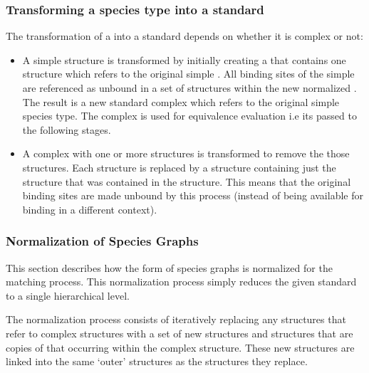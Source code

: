 \documentclass{cekarticle}
\begin{document}
\subsubsection{Transforming a species type into a standard }
\label{sec:trans-type}

The transformation of a  into a standard
 depends on whether it is complex or not:

\begin{itemize}

\item A simple  structure is transformed by
initially creating a  that contains one
 structure which refers to the original
simple . All binding sites of the simple
 are referenced as unbound in a set of
 structures within the new normalized
.  The result is a new standard complex
 which refers to the original simple species
type.  The complex  is used for equivalence
evaluation i.e its passed to the following stages.

\item A complex  with one or more
 structures is transformed to remove the those
 structures. Each  structure
is replaced by a  structure containing just
the  structure that was contained in
the  structure.  This means that the original
binding sites are made unbound by this process (instead of being
available for binding in a different context).

\end{itemize}

\subsubsection{Normalization of Species Graphs}
\label{sec:norm-graphs}

This section describes how the form of species graphs is
normalized for the matching process.  This normalization process
simply reduces the given standard  to a single
hierarchical level.

The normalization process consists of iteratively replacing any
 structures that refer to complex
 structures with a set of new
 structures and 
structures that are copies of that occurring within the complex
 structure.  These new structures are linked
into the same `outer'  structures as the
 structures they replace.
\end{document}
